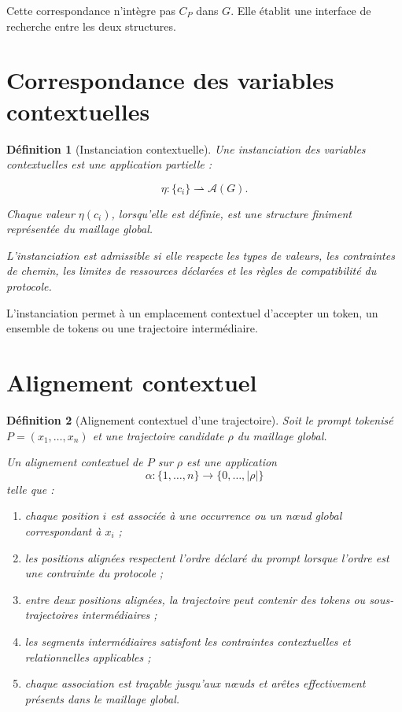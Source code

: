 \documentclass[11pt,a4paper,oneside]{book}
\newtheorem{definition}{Définition}[chapter]
\theoremstyle{remark}
\begin{document}
Cette correspondance n'intègre pas \(C_P\) dans \(G\). Elle établit
une interface de recherche entre les deux structures.

\section{Correspondance des variables contextuelles}

\begin{definition}[Instanciation contextuelle]
Une instanciation des variables contextuelles est une application
partielle :

\[
\eta:\{c_i\}\rightharpoonup\mathcal{A}(G).
\]

Chaque valeur \(\eta(c_i)\), lorsqu'elle est définie, est une
structure finiment représentée du maillage global.

L'instanciation est admissible si elle respecte les types de valeurs,
les contraintes de chemin, les limites de ressources déclarées
et les règles de compatibilité du protocole.
\end{definition}

L'instanciation permet à un emplacement contextuel d'accepter
un token, un ensemble de tokens ou une trajectoire intermédiaire.

\section{Alignement contextuel}

\begin{definition}[Alignement contextuel d'une trajectoire]
Soit le prompt tokenisé \(P=(x_1,\ldots,x_n)\) et une trajectoire
candidate \(\rho\) du maillage global.

Un alignement contextuel de \(P\) sur \(\rho\) est une application
\[
\alpha:\{1,\ldots,n\}\to\{0,\ldots,|\rho|\}
\]
telle que :

\begin{enumerate}
  \item chaque position \(i\) est associée à une occurrence ou
        un nœud global correspondant à \(x_i\) ;
  \item les positions alignées respectent l'ordre déclaré du prompt
        lorsque l'ordre est une contrainte du protocole ;
  \item entre deux positions alignées, la trajectoire peut contenir
        des tokens ou sous-trajectoires intermédiaires ;
  \item les segments intermédiaires satisfont les contraintes
        contextuelles et relationnelles applicables ;
  \item chaque association est traçable jusqu'aux nœuds et arêtes
        effectivement présents dans le maillage global.
\end{enumerate}
\end{definition}
\end{document}
